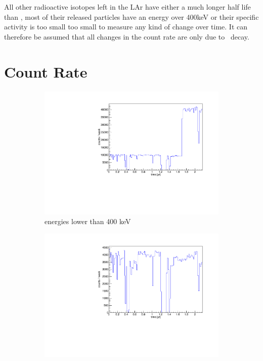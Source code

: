 \documentclass[encoding=utf8,british]{tumphthesis}
\begin{document}
All other radioactive isotopes left in the LAr have either a much longer half life than , most of their released particles have an energy over 400keV or their specific activity is too small too small to measure any kind of change over time.
It can therefore be assumed that all changes in the count rate are only due to \Kr\ decay.
\\



\section{Count Rate}
\label{sec:EventAct}

\begin{figure}[t!]
	\centering
	\begin{subfigure}{.475\textwidth}
		\centering
		\includegraphics[width=\textwidth]{./Bilder/ZeitverlaufALLE.pdf}
		\caption{energies lower than 400 keV}
		\label{fig:ZeitAll}
	\end{subfigure}\hfill%
	\begin{subfigure}{.475\textwidth}
		\centering
		\includegraphics[width=\textwidth]{./Bilder/ZeitverlaufLimits.pdf}

\end{subfigure}
\end{figure}
\end{document}
